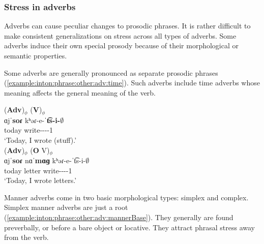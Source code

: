 \subsubsection{Stress in adverbs}\label{section:intonation:phrase:other:adv}

Adverbs can cause peculiar changes to prosodic phrases.  It is rather difficult to make consistent generalizations on stress across all types of adverbs. Some adverbs induce their own special prosody because of their morphological or semantic properties. 

Some adverbs are generally pronounced as separate prosodic phrases (\ref{example:inton:phrase:other:adv:time}). Such adverbs include time adverbs whose meaning affects the general meaning of the verb.

\begin{exe}
	\ex \label{example:inton:phrase:other:adv:time} \begin{xlist}
		\ex \glll (\textbf{Adv})$_\phi$ (\textbf{V})$_\phi$ \\
		ɑjˈ\textbf{soɾ}   kʰəɾ-e-ˈ\textbf{t͡s-i-$\emptyset$} \\
		today   write-{\thgloss}-{\aorperf}-{\pst}-1{\sg} \\
		\trans `Today, I wrote (stuff).' 
		\\ 
		\ex \glll (\textbf{Adv})$_\phi$ (\textbf{O} V)$_\phi$ \\
		ɑjˈ\textbf{soɾ}  nɑˈ\textbf{mɑɡ} kʰəɾ-e-ˈt͡s-i-$\emptyset$ \\
		today letter write-{\thgloss}-{\aorperf}-{\pst}-1{\sg} \\
		\trans `Today, I wrote letters.' 
		\\ 
	\end{xlist}
\end{exe}

Manner adverbs come in two basic morphological types: simplex and complex. Simplex manner adverbs are just a root (\ref{example:inton:phrase:other:adv:mannerBase}). They generally are found preverbally, or before a bare object or locative. They attract phrasal stress away from the verb.


